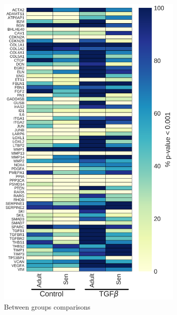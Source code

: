 \documentclass[alpha-refs]{wiley-article}
\begin{document}
\begin{figure}
	\centering
	\begin{subfigure}{0.45\linewidth}
		\includegraphics[height=0.7\textheight, width=\linewidth]{LIMMA09_2018/SavedObjects/pval_less_than_0_001/between_heatmap0_001}
		\caption{Between groups comparisons}
		\label{fig:between:heatmap}
	\end{subfigure}
	\begin{subfigure}{0.45\linewidth}

\end{subfigure}
\end{figure}
\end{document}
